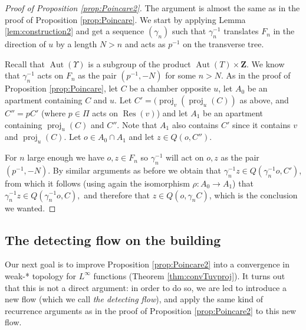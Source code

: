\documentclass[a4paper, 11pt]{article}
\theoremstyle{plain}
\theoremstyle{definition}
\theoremstyle{remark}
\DeclareMathOperator{\Aut}{Aut}
\DeclareMathOperator{\proj}{proj}
\DeclareMathOperator{\Res}{Res}
\newcommand{\ZZ}{\mathbf{Z}}                          %
\begin{document}
\begin{proof}[Proof of Proposition \ref{prop:Poincare2}]
The argument is almost the same as in the proof of Proposition \ref{prop:Poincare}. 
We start by applying Lemma \ref{lem:construction2} and get a sequence $(\gamma_n)$ such that $\gamma_n^{-1}$ translates $F_n$ in the direction of $u$ by a length $N>n$ and acts as $p^{-1}$ on the transverse tree.

Recall that $\Aut(\Upsilon)$ is a subgroup of the product $\Aut(T)\times \ZZ$. 
We know that $\gamma_n^{-1}$ acts on $F_n$ as the pair $(p^{-1},-N)$ for some $n>N$. As in the proof of Proposition \ref{prop:Poincare}, let $C$ be a chamber opposite $u$, let $A_0$ be an apartment containing $C$ and $u$. Let $C'=  (\proj_v(\proj_u(C))$ as above, and $C''=pC'$ (where $p\in \Pi$ acts on $\Res(v)$) and let $A_1$ be an apartment containing $\proj_u(C)$ and $C''$. Note that $A_1$ also contains $C'$ since it contains $v$ and $\proj_u(C)$. Let $o\in A_0\cap A_1$ and let $z\in Q(o,C'')$. %

 For $n$ large enough we have $o,z\in F_n$ so $\gamma_n^{-1}$ will act on $o,z$ as the pair $(p^{-1},-N)$. By similar arguments as before we obtain that $\gamma_n^{-1}z\in Q(\gamma_n^{-1} o,C')$, from which it follows (using again the isomorphism $\rho:A_0\to A_1$) that $\gamma_n^{-1}z\in Q(\gamma^{-1}_n o,C),$ and therefore that $z\in Q(o,\gamma_nC)$, which is the conclusion we wanted.
 

\end{proof}




\subsection{The detecting flow on the building}\label{sec:detecting}

Our next goal is to improve Proposition \ref{prop:Poincare2} into a convergence in weak-* topology for $L^\infty$ functions (Theorem \ref{thm:convTuvproj}). It turns out that this is not a direct argument: in order to do so, we are led to introduce a new flow (which we call \emph{the detecting flow}), and apply the same kind of recurrence arguments as in the proof of Proposition \ref{prop:Poincare2} to this new flow.
\end{document}

